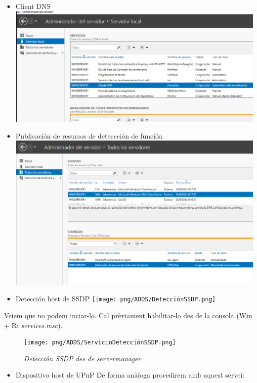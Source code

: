 \documentclass[
  a4paper,
]{article}
\providecommand{\tightlist}{%
  \setlength{\itemsep}{0pt}\setlength{\parskip}{0pt}}
\begin{document}
\begin{itemize}
\item
  Client DNS \includegraphics{png/ADDS/ClienteDNS.png}
\item
  Publicación de resursos de deteccción de función
  \includegraphics{png/ADDS/PublicacióndeRecursodeDeteccióndeFunción.png}
\item
  Detección host de SSDP \texttt{[image: png/ADDS/DetecciónSSDP.png]}
\end{itemize}

Veiem que no podem inciar-lo. Cal prèviament habilitar-lo des de la
consola (Win + R: \emph{services.msc}).

\begin{figure}
\centering
\texttt{[image: png/ADDS/ServicioDetecciónSSDP.png]}
\caption{\emph{Detección SSDP des de servermanager}}
\end{figure}

\begin{itemize}
\tightlist
\item
  Dispositivo host de UPnP De forma anàloga procedirem amb aquest
  servei:
\end{itemize}
\end{document}
